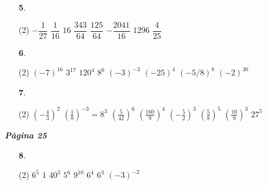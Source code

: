 \documentclass[a4paper, pdf, twoside]{book}
\begin{document}
\begin{multicols}{2}
\begin{enumerate}

 \item[\fontfamily{phv}\selectfont\color{blue}\textbf{5}. ] 
 \begin{tasks}[column-sep=1em, item-indent=1.3333em](2)
	 \task $-\dfrac {1}{27}$
	 \task $\dfrac {1}{16}$
	 \task $16$
	 \task $\dfrac {343}{64}$
	 \task $\dfrac {125}{64}$
	 \task $-\dfrac {2041}{16}$
	 \task $1296$
	 \task $\dfrac {4}{25}$
\end{tasks}
 \end{enumerate}
\begin{enumerate}
\vspace{0.25cm}



 \item[\fontfamily{phv}\selectfont\color{blue}\textbf{6}. ] 
 \begin{tasks}[column-sep=1em, item-indent=1.3333em](2)
	 \task $(-7)^{16}$
	 \task $3^{17}$
	 \task $120^4$
	 \task $8^6$
	 \task $(-3)^{-3}$
	 \task $(-25)^4$
	 \task $(-5/8)^8$
	 \task $(-2)^{30}$
\end{tasks}
\vspace{0.25cm}



 \item[\fontfamily{phv}\selectfont\color{blue}\textbf{7}. ] 
 \begin{tasks}[column-sep=1em, item-indent=1.3333em](2)
	 \task* $\left (-\frac {4}{3} \right )^{2}$
	 \task* $\left (\frac {1}{8} \right )^{-3}=8^3$
	 \task* $\left (\frac {5}{42} \right )^6$
	 \task* $\left (\frac {160}{9} \right )^4$
	 \task* $\left (-\frac {5}{2} \right )^3$
	 \task* $\left (\frac {5}{8} \right )^5$
	 \task* $\left (\frac {10}{9} \right )^3$
	 \task $27^5$
\end{tasks}
 \end{enumerate}
\vspace{0.3cm}


{\textbf{\em Pàgina 25}} \hrulefill
\begin{enumerate}
\vspace{0.25cm}



 \item[\fontfamily{phv}\selectfont\color{blue}\textbf{8}. ] 
 \begin{tasks}[column-sep=1em, item-indent=1.3333em](2)
	 \task $6^5$
	 \task $1$
	 \task $40^3$
	 \task $5^6$
	 \task $9^{10}$
	 \task $6^4$
	 \task $6^3$
	 \task $(-3)^{-2}$
\end{tasks}
 \end{enumerate}
\begin{enumerate}
\vspace{0.25cm}



\end{enumerate}
\end{multicols}
\end{document}
